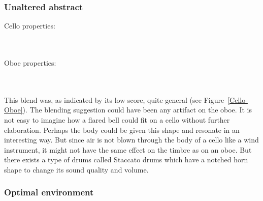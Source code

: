 \subsubsection{Unaltered abstract}

Cello properties:

\noindent{}
\\\\Oboe properties:


\noindent{}	
\\\\This blend was, as indicated by its low score, quite general (see Figure~\ref{Cello-Oboe}). The blending suggestion could have been any artifact on the oboe. It is not easy to imagine how a flared bell could fit on a cello without further elaboration. Perhaps the body could be given this shape and resonate in an interesting way. But since air is not blown through the body of a cello like a wind instrument, it might not have the same effect on the timbre as on an oboe. But there exists a type of drums called Staccato drums which have a notched horn shape to change its sound quality and volume.

\subsubsection{Optimal environment}

